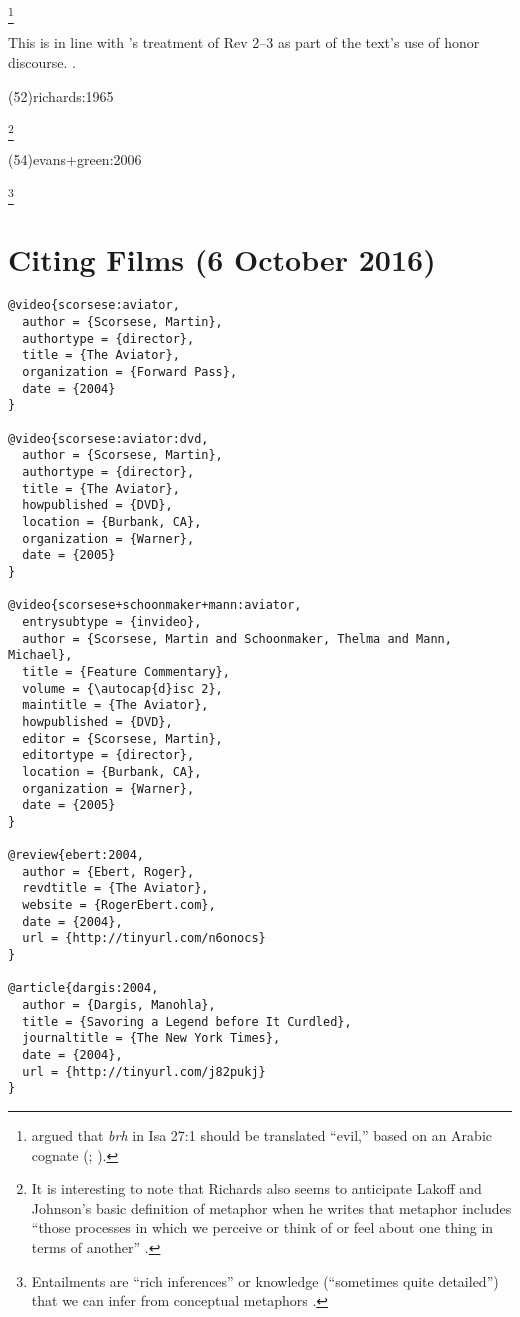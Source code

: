 \documentclass[a4paper]{article}
\begin{document}
\begin{fverbcite}{97}
  \footnote{\citeauthor{gordon:1953} argued that \emph{brh} in Isa 27:1 should
  be translated “evil,” based on an Arabic cognate
  \mkbibparens{\cite*[243]{gordon:1953}; \cite[see also][376]{gordon:1965}}.}
\end{fverbcite}
\begin{fverbcite}{77}
  This is in line with \citeauthor*{desilva:1998}’s treatment of Rev 2–3 as
  part of the text’s use of honor discourse. \cite[See][]{desilva:1998}.
\end{fverbcite}
\examplecite(52){richards:1965}
\begin{fverbcite}{53}
  \footnote{It is interesting to note that Richards also seems to anticipate
  Lakoff and Johnson’s basic definition of metaphor when he writes that
  metaphor includes “those processes in which we perceive or think of or feel
  about one thing in terms of another” \autocite[116-117]{richards:1965}.}
\end{fverbcite}
\examplecite(54){evans+green:2006}
\begin{fverbcite}{55}
  \footnote{Entailments are “rich inferences” or knowledge (“sometimes quite
  detailed”) that we can infer from conceptual metaphors
  \autocite[298-299]{evans+green:2006}.}
\end{fverbcite}
\exampleabbreviations
\examplebibliography
{}

\section{Citing Films (6 October 2016)}

\begin{verbatim}
@video{scorsese:aviator,
  author = {Scorsese, Martin},
  authortype = {director},
  title = {The Aviator},
  organization = {Forward Pass},
  date = {2004}
}

@video{scorsese:aviator:dvd,
  author = {Scorsese, Martin},
  authortype = {director},
  title = {The Aviator},
  howpublished = {DVD},
  location = {Burbank, CA},
  organization = {Warner},
  date = {2005}
}

@video{scorsese+schoonmaker+mann:aviator,
  entrysubtype = {invideo},
  author = {Scorsese, Martin and Schoonmaker, Thelma and Mann, Michael},
  title = {Feature Commentary},
  volume = {\autocap{d}isc 2},
  maintitle = {The Aviator},
  howpublished = {DVD},
  editor = {Scorsese, Martin},
  editortype = {director},
  location = {Burbank, CA},
  organization = {Warner},
  date = {2005}
}

@review{ebert:2004,
  author = {Ebert, Roger},
  revdtitle = {The Aviator},
  website = {RogerEbert.com},
  date = {2004},
  url = {http://tinyurl.com/n6onocs}
}

@article{dargis:2004,
  author = {Dargis, Manohla},
  title = {Savoring a Legend before It Curdled},
  journaltitle = {The New York Times},
  date = {2004},
  url = {http://tinyurl.com/j82pukj}
}
\end{verbatim}
\end{document}
